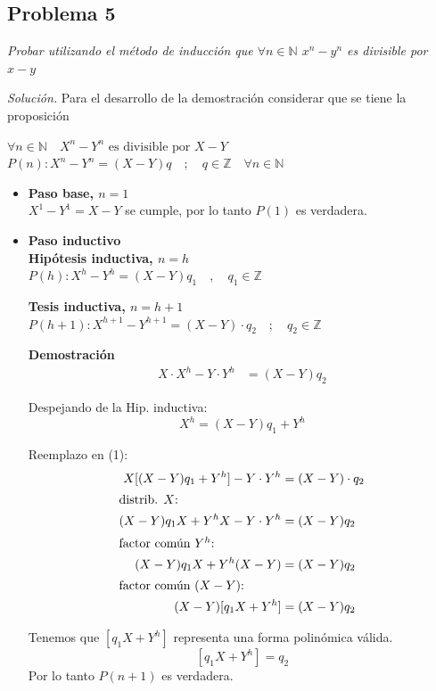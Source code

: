 \documentclass{article}
\begin{document}
\subsection{Problema 5}
\label{sec:problema-5}
\textit{Probar utilizando el método de inducción que $\forall n \in \mathbb{N}$ $x^n - y^n$ es divisible por $x - y$}
\bigskip

\textit{Solución.} Para el desarrollo de la demostración considerar que se tiene la proposición 


\noindent $\forall n \in \mathbb{N} \quad X^n - Y^n \text{ es divisible por } X - Y$ \\[0.3cm]
$P(n): X^n - Y^n = (X - Y)q \quad ; \quad q \in \mathbb{Z} \quad \forall n \in \mathbb{N}$

\begin{itemize}
\item  \textbf{Paso base, $n=1$} \\
$X^1 - Y^1 = X - Y$ se cumple, por lo tanto $P(1)$ es verdadera.

\item \textbf{Paso inductivo} \\
\textbf{Hipótesis inductiva, $n=h$} \\
$P(h): X^h - Y^h = (X - Y)q_1 \quad , \quad q_1 \in \mathbb{Z}$

\vspace{0.2cm}
\noindent \textbf{Tesis inductiva, $n=h+1$} \\
$P(h+1): X^{h+1} - Y^{h+1} = (X - Y) \cdot q_2 \quad ; \quad q_2 \in \mathbb{Z}$

\vspace{0.4cm}
\noindent \textbf{Demostración}
\begin{align}
    X \cdot X^h - Y \cdot Y^h &= (X - Y) q_2 
\end{align}

\noindent Despejando de la Hip. inductiva:
\[ X^h = (X - Y)q_1 + Y^h \]

\noindent Reemplazo en (1):
\begin{align*}
    X[(X - Y)q_1 + Y^h] - Y \cdot Y^h &= (X - Y) \cdot q_2 \\
    \intertext{distrib. $X$:}
    (X - Y)q_1 X + Y^h X - Y \cdot Y^h &= (X - Y)q_2 \\
    \intertext{factor común $Y^h$:}
    (X - Y)q_1 X + Y^h(X - Y) &= (X - Y)q_2 \\
    \intertext{factor común $(X - Y)$:}
    (X - Y)[q_1 X + Y^h] &= (X - Y)q_2
\end{align*}

\noindent Tenemos que $[q_1 X + Y^h]$ representa una forma polinómica válida.
\[ [q_1 X + Y^h] = q_2 \]
Por lo tanto $P(n+1)$ es verdadera.
\end{itemize}
\end{document}

